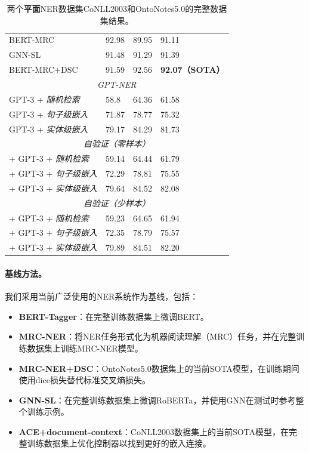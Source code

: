 \documentclass[supercite]{Experimental_Report}
\theoremstyle{definition}
\begin{document}
\begin{table}[th!]
{\begin{tabular}{llll}
        BERT-MRC \cite{li2019unified} & 92.98 & 89.95 & 91.11 \\
        GNN-SL \cite{wang2022gnn} & 91.48 & 91.29  & 91.39 \\
        BERT-MRC+DSC \cite{li2019dice} & 91.59 & 92.56 & \textbf{92.07（SOTA）} \\ \midrule
        \multicolumn{4}{c}{{\it GPT-NER}} \\ \midrule
        GPT-3 + \textit{随机检索} & 58.8 & 64.36 & 61.58 \\
        GPT-3 + \textit{句子级嵌入} & 71.87 & 78.77 & 75.32 \\
        GPT-3 + \textit{实体级嵌入} & 79.17 & 84.29 & 81.73 \\ \midrule
        \multicolumn{4}{c}{{\it 自验证（零样本）}} \\ \midrule
        + GPT-3 + \textit{随机检索} & 59.14 & 64.44 & 61.79 \\
        + GPT-3 + \textit{句子级嵌入} & 72.29 & 78.81 & 75.55 \\
        + GPT-3 + \textit{实体级嵌入} & 79.64 & 84.52 & 82.08 \\ \midrule
        \multicolumn{4}{c}{{\it 自验证（少样本）}} \\ \midrule
        + GPT-3 + \textit{随机检索} & 59.23 & 64.65 & 61.94 \\
        + GPT-3 + \textit{句子级嵌入} & 72.35 & 78.79 & 75.57 \\
        + GPT-3 + \textit{实体级嵌入} & 79.89 & 84.51 & 82.20 \\ \bottomrule
    \end{tabular}
    }
     \caption{两个\textbf{平面}NER数据集CoNLL2003和OntoNotes5.0的完整数据集结果。}
    \label{tab:ner_result}
\end{table}

\paragraph{基线方法。}我们采用当前广泛使用的NER系统作为基线，包括：
\begin{itemize}
  \item \textbf{BERT-Tagger}\cite{devlin2018bert}：在完整训练数据集上微调BERT。
  \item \textbf{MRC-NER}\cite{li2019unified}：将NER任务形式化为机器阅读理解（MRC）任务，并在完整训练数据集上训练MRC-NER模型。
  \item \textbf{MRC-NER+DSC}\cite{li2019dice}：OntoNotes5.0数据集上的当前SOTA模型，在训练期间使用dice损失替代标准交叉熵损失。
  \item \textbf{GNN-SL}\cite{wang2022gnn}：在完整训练数据集上微调RoBERTa\cite{liu2019roberta}，并使用GNN在测试时参考整个训练示例。
  \item \textbf{ACE+document-context}\cite{wang2020automated}：CoNLL2003数据集上的当前SOTA模型，在完整训练数据集上优化控制器以找到更好的嵌入连接。
\end{itemize}
\end{document}
